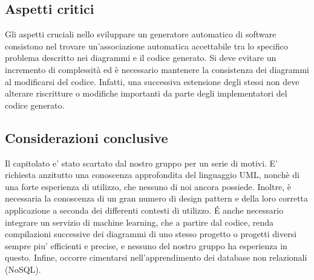 \subsection{Aspetti critici}

Gli aspetti cruciali nello sviluppare un generatore automatico di
software consistono nel trovare un'associazione automatica accettabile
tra lo specifico problema descritto nei diagrammi e il codice generato. Si deve evitare un incremento di complessità ed è necessario mantenere la consistenza dei diagrammi al modificarsi del codice. Infatti, una successiva estensione degli stessi non deve alterare riscritture o modifiche importanti da parte degli implementatori del codice generato.

\subsection{Considerazioni conclusive}

Il capitolato e' stato scartato dal nostro gruppo per un serie di
motivi. E' richiesta anzitutto una conoscenza approfondita del linguaggio
UML, nonchè di una forte esperienza di utilizzo, che nessuno di noi ancora possiede. Inoltre, è necessaria la conoscenza di un gran numero di design pattern e della loro corretta applicazione a seconda dei differenti contesti di utilizzo. \'{E} anche necessario integrare un servizio
di machine learning, che a partire dal codice, renda compilazioni
successive dei diagrammi di uno stesso progetto o progetti diversi
sempre piu' efficienti e precise, e nessuno del nostro gruppo ha esperienza
in questo. Infine, occorre cimentarsi nell'apprendimento dei database non relazionali (NoSQL). 